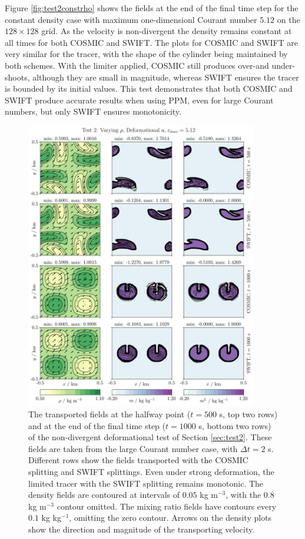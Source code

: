 \documentclass[11pt,a4paper]{article}
\begin{document}
Figure \ref{fig:test2constrho} shows the fields at the end of the final time step for the constant density case with maximum one-dimensionl Courant number $5.12$ on the $128\times128$ grid. As the velocity is non-divergent the density remains constant at all times for both COSMIC and SWIFT. The plots for COSMIC and SWIFT are very similar for the tracer, with the shape of the cylinder being maintained by both schemes. With the limiter applied, COSMIC still produces over-and under-shoots, although they are small in magnitude, whereas SWIFT ensures the tracer is bounded by its initial values. This test demonstrates that both COSMIC and SWIFT produce accurate results when using PPM, even for large Courant numbers, but only SWIFT ensures monotonicity. \\
\begin{figure}[ht!]
\centering
\includegraphics[width=0.9\textwidth]{fig_4_deformational.jpg}
\caption{The transported fields at the halfway point ($t=500$ s, top two rows) and at the end of the final time step ($t=1000$ s, bottom two rows) of the non-divergent deformational test of Section \ref{sec:test2}. These fields are taken from the large Courant number case, with $\Delta t=2$ s. Different rows show the fields transported with the COSMIC splitting and SWIFT splittings.
Even under strong deformation, the limited tracer with the SWIFT splitting remains monotonic.
The density fields are contoured at intervals of $0.05$ kg m$^{-3}$, with the $0.8$ kg m$^{-3}$ contour omitted.
The mixing ratio fields have contours every $0.1$ kg kg$^{-1}$, omitting the zero contour.
Arrows on the density plots show the direction and magnitude of the transporting velocity.}\label{fig:test2}
\end{figure} 
\end{document}
